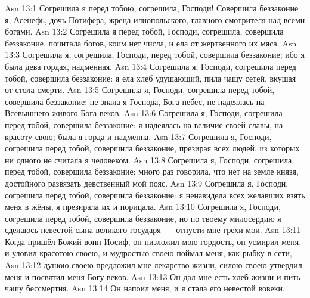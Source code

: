 \vs Asn 13:1
Согрешила я перед тобою, согрешила, Господи!
Совершила беззаконие я, Асенефь, дочь Потифера,
жреца илиопольского, главного смотрителя над всеми богами.
\vs Asn 13:2
Согрешила я перед тобой, Господи, согрешила,
совершила беззаконие, почитала богов, коим нет числа,
и ела от жертвенного их мяса.
\vs Asn 13:3
Согрешила я, согрешила, Господи, перед тобой,
совершила беззаконие; ибо я была дева гордая, надменная.
\vs Asn 13:4
Согрешила я, Господи, согрешила перед тобой,
совершила беззаконие: я ела хлеб удушающий,
пила чашу сетей, вкушая от стола смерти.
\vs Asn 13:5
Согрешила я, Господи, согрешила перед тобой,
совершила беззаконие: не знала я Господа, Бога небес, не
надеялась на Всевышнего живого Бога веков.
\vs Asn 13:6
Согрешила я, Господи, согрешила перед тобой,
совершила беззаконие: я надеялась на величие своей
славы, на красоту свою; была я горда и надменна.
\vs Asn 13:7
Согрешила я, Господи, согрешила перед тобой,
совершила беззаконие, презирая всех людей, из которых ни
одного не считала я человеком.
\vs Asn 13:8
Согрешила я, Господи, согрешила перед тобой,
совершила беззаконие; много раз говорила, что нет на земле
князя, достойного развязать девственный мой пояс.
\vs Asn 13:9
Согрешила я, Господи, согрешила перед тобой,
совершила беззаконие: я ненавидела всех желавших взять
меня в жёны, я презирала их и порицала.
\vs Asn 13:10
Согрешила я, Господи, согрешила перед тобой,
совершила беззаконие, но по твоему милосердию я
сделаюсь невестой сына великого государя~--- отпусти мне грехи мои.
\vs Asn 13:11
Когда пришёл Божий воин Иосиф,
он низложил мою гордость, он усмирил меня,
и уловил красотою своею,
и мудростью своею поймал меня, как рыбку в сети,
\vs Asn 13:12
душою своею предложил мне лекарство жизни,
силою своею утвердил меня и посвятил меня Богу веков.
\vs Asn 13:13
Он дал мне есть хлеб жизни и пить чашу бессмертия.
\vs Asn 13:14
Он напоил меня, и я стала его невестой вовеки.

